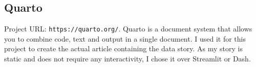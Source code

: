 \documentclass{article}
\begin{document}
\subsection{Quarto}
Project URL: \texttt{https://quarto.org/}.\newline
Quarto is a document system that allows you to combine code, text and output in a single document.
I used it for this project to create the actual article containing the data story.
As my story is static and does not require any interactivity, I chose it over Streamlit or Dash.

\newpage
\end{document}
